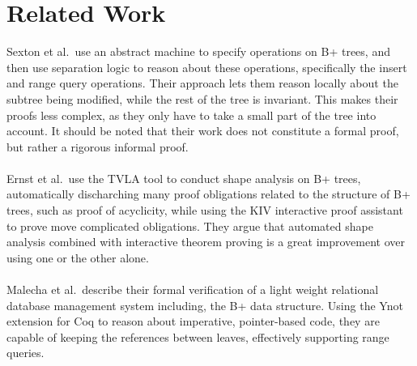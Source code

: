 \section{Related Work}
\label{sec:RelatedWork}
Sexton et al.\,\cite{sexton2008reasoning} use an abstract machine to specify operations on B+ trees, and then use separation logic to reason about these operations, specifically the insert and range query operations. Their approach lets them reason locally about the subtree being modified, while the rest of the tree is invariant. This makes their proofs less complex, as they only have to take a small part of the tree into account. It should be noted that their work does not constitute a formal proof, but rather a rigorous informal proof.

\paragraph{}
Ernst et al.\,\cite{ernst2011verification} use the TVLA tool to conduct shape analysis on B+ trees, automatically discharching many proof obligations related to the structure of B+ trees, such as proof of acyclicity, while using the KIV interactive proof assistant to prove move complicated obligations. They argue that automated shape analysis combined with interactive theorem proving is a great improvement over using one or the other alone.

\paragraph{}
Malecha et al.\,\cite{malecha2010toward} describe their formal verification of a light weight relational database management system including, the B+ data structure. Using the Ynot extension for Coq to reason about imperative, pointer-based code, they are capable of keeping the references between leaves, effectively supporting range queries.
